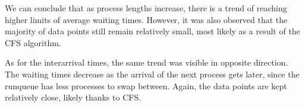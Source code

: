 \documentclass[a4paper, 12pt]{article}
\begin{document}
  \vspace{30pt}

  We can conclude that as process lengths increase, there is a trend of reaching higher limits of average waiting times.
  However, it was also observed that the majority of data points still remain relatively small, most likely
  as a result of the CFS algorithm.

  As for the interarrival times, the same trend was visible in opposite direction.
  The waiting times decrease as the arrival of the next process gets later, since the runqueue has
  less processes to swap between. Again, the data points are kept relatively close, likely thanks to CFS.
\end{document}
